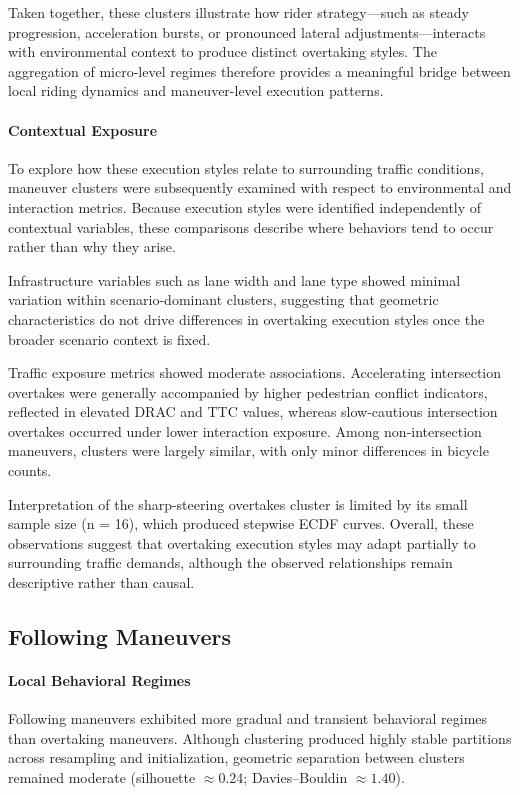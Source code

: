 Taken together, these clusters illustrate how rider strategy—such as steady progression, acceleration bursts, or pronounced lateral adjustments—interacts with environmental context to produce distinct overtaking styles. The aggregation of micro-level regimes therefore provides a meaningful bridge between local riding dynamics and maneuver-level execution patterns.

\paragraph{Contextual Exposure}
To explore how these execution styles relate to surrounding traffic conditions, maneuver clusters were subsequently examined with respect to environmental and interaction metrics. Because execution styles were identified independently of contextual variables, these comparisons describe where behaviors tend to occur rather than why they arise.

Infrastructure variables such as lane width and lane type showed minimal variation within scenario-dominant clusters, suggesting that geometric characteristics do not drive differences in overtaking execution styles once the broader scenario context is fixed.

Traffic exposure metrics showed moderate associations. Accelerating intersection overtakes were generally accompanied by higher pedestrian conflict indicators, reflected in elevated DRAC and TTC values, whereas slow-cautious intersection overtakes occurred under lower interaction exposure. Among non-intersection maneuvers, clusters were largely similar, with only minor differences in bicycle counts.

Interpretation of the sharp-steering overtakes cluster is limited by its small sample size (n = 16), which produced stepwise ECDF curves. Overall, these observations suggest that overtaking execution styles may adapt partially to surrounding traffic demands, although the observed relationships remain descriptive rather than causal.

\subsection{Following Maneuvers}

\paragraph{Local Behavioral Regimes}
Following maneuvers exhibited more gradual and transient behavioral regimes than overtaking maneuvers. Although clustering produced highly stable partitions across resampling and initialization, geometric separation between clusters remained moderate (silhouette $ \approx 0.24 $; Davies–Bouldin $ \approx 1.40 $).

